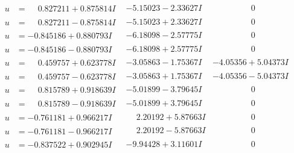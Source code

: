 \documentclass[1p]{elsarticle_modified}
\theoremstyle{definition}
\begin{document}
$$\begin{array}{c|c|c}
 \hline 
\begin{aligned}
u &= \phantom{-}0.827211 + 0.875814 I\end{aligned}
 & -5.15023 - 2.33627 I & \phantom{-0.000000 } 0 \\ \hline\begin{aligned}
u &= \phantom{-}0.827211 - 0.875814 I\end{aligned}
 & -5.15023 + 2.33627 I & \phantom{-0.000000 } 0 \\ \hline\begin{aligned}
u &= -0.845186 + 0.880793 I\end{aligned}
 & -6.18098 - 2.57775 I & \phantom{-0.000000 } 0 \\ \hline\begin{aligned}
u &= -0.845186 - 0.880793 I\end{aligned}
 & -6.18098 + 2.57775 I & \phantom{-0.000000 } 0 \\ \hline\begin{aligned}
u &= \phantom{-}0.459757 + 0.623778 I\end{aligned}
 & -3.05863 - 1.75367 I & -4.05356 + 5.04373 I \\ \hline\begin{aligned}
u &= \phantom{-}0.459757 - 0.623778 I\end{aligned}
 & -3.05863 + 1.75367 I & -4.05356 - 5.04373 I \\ \hline\begin{aligned}
u &= \phantom{-}0.815789 + 0.918639 I\end{aligned}
 & -5.01899 - 3.79645 I & \phantom{-0.000000 } 0 \\ \hline\begin{aligned}
u &= \phantom{-}0.815789 - 0.918639 I\end{aligned}
 & -5.01899 + 3.79645 I & \phantom{-0.000000 } 0 \\ \hline\begin{aligned}
u &= -0.761181 + 0.966217 I\end{aligned}
 & \phantom{-}2.20192 + 5.87663 I & \phantom{-0.000000 } 0 \\ \hline\begin{aligned}
u &= -0.761181 - 0.966217 I\end{aligned}
 & \phantom{-}2.20192 - 5.87663 I & \phantom{-0.000000 } 0 \\ \hline\begin{aligned}
u &= -0.837522 + 0.902945 I\end{aligned}
 & -9.94428 + 3.11601 I & \phantom{-0.000000 } 0 \\ \hline\begin{aligned}

\end{aligned}
\end{array}$$
\end{document}
